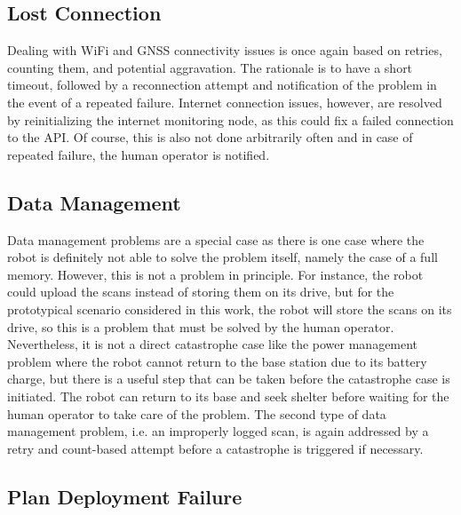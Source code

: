 \documentclass[english, master, utf8]{base/thesis_KBS}
\newcommand{\code}{\collectverb{\codebox}}
\begin{document}
\subsection{Lost Connection}
\label{sec:connection_resolver}

Dealing with WiFi and GNSS connectivity issues is once again based on retries, counting them, and potential aggravation. The rationale is to have a short timeout, followed by a
reconnection attempt and notification of the problem in the event of a repeated failure. Internet connection issues, however, are resolved by
reinitializing the internet monitoring node, as this could fix a failed connection to the \code{speedtest} API. Of course, this is also not done arbitrarily often and in case of
repeated failure, the human operator is notified.

\subsection{Data Management}
\label{sec:data_management_resolver}

Data management problems are a special case as there is one case where the robot is definitely not able to solve the problem itself, namely the case of a full memory. However, this is
not a problem in principle. For instance, the robot could upload the scans instead of storing them on its drive, but for the prototypical scenario considered in this work, the robot
will store the scans on its drive, so this is a problem that must be solved by the human operator. Nevertheless, it is not a direct catastrophe case like the power management problem
where the robot cannot return to the base station due to its battery charge, but there is a useful step that can be taken before the catastrophe case is initiated. The robot can
return to its base and seek shelter before waiting for the human operator to take care of the problem. The second type of data management problem, i.e. an improperly logged scan, is
again addressed by a retry and count-based attempt before a catastrophe is triggered if necessary.

\subsection{Plan Deployment Failure}
\label{sec:plan_deployment_resolver}
\end{document}
